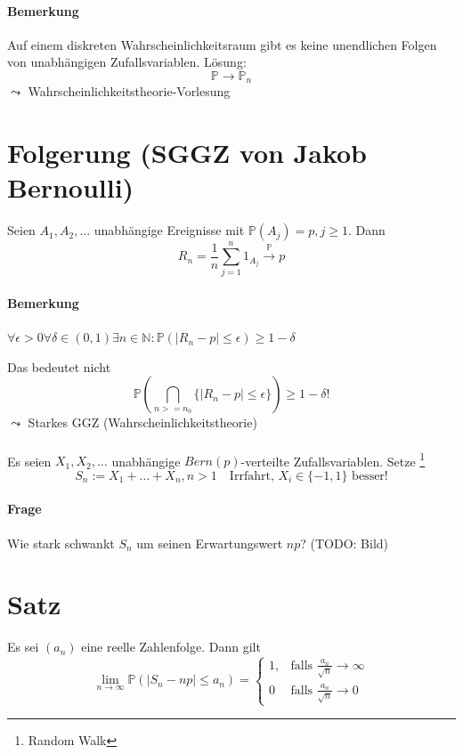 \documentclass[a4paper,11pt,notitlepage]{report}
\newcommand{\N}{{\ensuremath{\mathbb{N}}}}
\newcommand{\Prim}{{\ensuremath{\mathbb{P}}}}
\begin{document}
\paragraph{Bemerkung} Auf einem diskreten Wahrscheinlichkeitsraum gibt es keine unendlichen Folgen von unabhängigen Zufallsvariablen. Lösung: 
$$\Prim \rightarrow \Prim_n$$ $\leadsto $ Wahrscheinlichkeitstheorie-Vorlesung

\section{Folgerung (SGGZ von Jakob Bernoulli)}
Seien $A_1, A_2, \ldots$ unabhängige Ereignisse mit $\Prim(A_j) = p, j \geq 1.$ Dann
$$R_n = \frac{1}{n} \sum\limits_{j=1}^n{1_{A_j}} \overset{\Prim}{\rightarrow} p$$

\paragraph{Bemerkung} $\forall \epsilon > 0 \forall \delta \in (0,1) \exists n \in \N \colon \Prim (|R_n-p| \leq \epsilon) \geq 1- \delta$

Das bedeutet nicht
$$\Prim(\bigcap\limits_{n >= n_0}{\{ |R_n - p| \leq \epsilon\}}) \geq 1- \delta !$$
$\leadsto$ Starkes GGZ (Wahrscheinlichkeitstheorie)

\paragraph{}
Es seien $X_1, X_2, \ldots$ unabhängige $Bern(p)$-verteilte Zufallsvariablen. 
Setze \footnote{Random Walk}
$$S_n := X_1 + \ldots + X_n, n > 1 \quad \text{Irrfahrt, } X_i \in \{-1,1\} \text{ besser!}$$

\paragraph{Frage} Wie stark schwankt $S_n$ um seinen Erwartungswert $np$?
(TODO: Bild)

\section{Satz}
Es sei $(a_n)$ eine reelle Zahlenfolge. Dann gilt 
$$\lim_{n \rightarrow \infty}{\Prim(|S_n-np|\leq a_n)} = \begin{cases}  1, & \text{falls } \frac{a_n}{\sqrt{n}} \rightarrow \infty \\ 0 & \text{falls } \frac{a_n}{\sqrt{n}} \rightarrow 0  \end{cases}$$
\end{document}
